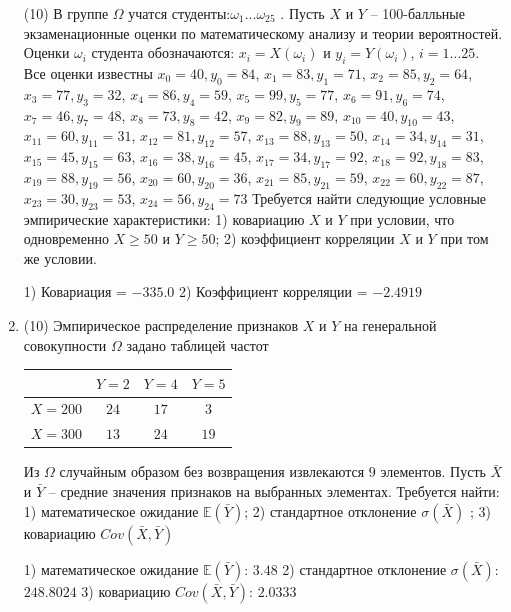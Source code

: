 \documentclass[a4paper,14pt]{article}
\begin{document}
\begin{enumerate}
(10) В группе $\Omega$ учатся студенты:$\omega _{1}...\omega _{25}$ . Пусть $X$ и $Y$ – 100-балльные экзаменационные оценки по
математическому анализу и теории вероятностей. Оценки $\omega _{i}$ студента обозначаются: $x _{i} = X(\omega _{i})$ и $y _{i} = Y(\omega _{i})$, $i = 1...25$. Все оценки известны
$x _{0} = 40, y _{0} = 84$, $x _{1} = 83, y _{1} = 71$, $x _{2} = 85, y _{2} = 64$, $x _{3} = 77, y _{3} = 32$, $x _{4} = 86, y _{4} = 59$, $x _{5} = 99, y _{5} = 77$, $x _{6} = 91, y _{6} = 74$, $x _{7} = 46, y _{7} = 48$, $x _{8} = 73, y _{8} = 42$, $x _{9} = 82, y _{9} = 89$, $x _{10} = 40, y _{10} = 43$, $x _{11} = 60, y _{11} = 31$, $x _{12} = 81, y _{12} = 57$, $x _{13} = 88, y _{13} = 50$, $x _{14} = 34, y _{14} = 31$, $x _{15} = 45, y _{15} = 63$, $x _{16} = 38, y _{16} = 45$, $x _{17} = 34, y _{17} = 92$, $x _{18} = 92, y _{18} = 83$, $x _{19} = 88, y _{19} = 56$, $x _{20} = 60, y _{20} = 36$, $x _{21} = 85, y _{21} = 59$, $x _{22} = 60, y _{22} = 87$, $x _{23} = 30, y _{23} = 53$, $x _{24} = 56, y _{24} = 73$
Требуется
найти следующие условные эмпирические характеристики: 1) ковариацию $X$ и $Y$ при условии, что одновременно $X \geqslant 50$
 и $Y \geqslant 50$; 2) коэффициент корреляции $X$ и $Y$ при том же условии.




1) Ковариация = $-335.0$
2) Коэффициент корреляции = $-2.4919$


\item


(10) Эмпирическое распределение признаков $X$ и $Y$ на генеральной совокупности $\Omega$ задано таблицей частот  
 
\begin{tabular}{ | c | c | c | c | }
\hline
 & $Y = 2$ & $Y = 4$ & $Y = 5$  \\ \hline
$X = 200$ & $24$ & $17$ & $3$\\ \hline
$X = 300$ & $13$ & $24$ & $19$\\
\hline
\end{tabular}

Из $\Omega$ случайным образом без возвращения извлекаются $9$ элементов. 
Пусть $\bar X$ и $\bar Y$ – средние значения признаков на выбранных элементах. 
Требуется найти: 1) математическое ожидание $\mathbb{E}(\bar Y)$; 2) стандартное отклонение $\sigma(\bar X)$ ; 
3) ковариацию $Cov(\bar X, \bar Y)$




1) математическое ожидание $\mathbb{E}(\bar Y)$: $3.48$ 
2) стандартное отклонение $\sigma(\bar X)$: $248.8024$
3) ковариацию $Cov(\bar X, \bar Y)$: $2.0333$



\end{enumerate}
\end{document}
